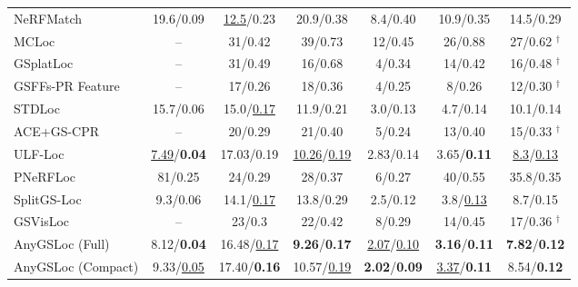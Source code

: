 \begin{table}[!t]
\begin{tabular}{@{}lcccccc@{}}
NeRFMatch~\cite{zhou2024nerfmatch} & 19.6/0.09 & \underline{12.5}/0.23 & 20.9/0.38 & 8.4/0.40 & 10.9/0.35 & 14.5/0.29 \\
MCLoc~\cite{reported260504730v1bibbib57} & -- & 31/0.42 & 39/0.73 & 12/0.45 & 26/0.88 & 27/0.62 $^\dagger$ \\
GSplatLoc~\cite{reported260504730v1bibbib47} & -- & 31/0.49 & 16/0.68 & 4/0.34 & 14/0.42 & 16/0.48 $^\dagger$ \\
GSFFs-PR Feature~\cite{reported260504730v1bibbib52} & -- & 17/0.26 & 18/0.36 & 4/0.25 & 8/0.26 & 12/0.30 $^\dagger$ \\
STDLoc~\cite{huang2025stdloc} & 15.7/0.06 & 15.0/\underline{0.17} & 11.9/0.21 & 3.0/0.13 & 4.7/0.14 & 10.1/0.14 \\
ACE+GS-CPR~\cite{reported260504730v1bibbib61} & -- & 20/0.29 & 21/0.40 & 5/0.24 & 13/0.40 & 15/0.33 $^\dagger$ \\
ULF-Loc~\cite{gu2026ulfloc} & \underline{7.49}/\textbf{0.04} & 17.03/0.19 & \underline{10.26}/\underline{0.19} & 2.83/0.14 & 3.65/\textbf{0.11} & \underline{8.3}/\underline{0.13} \\
PNeRFLoc~\cite{reported250319358v1bibbib68} & 81/0.25 & 24/0.29 & 28/0.37 & 6/0.27 & 40/0.55 & 35.8/0.35 \\
SplitGS-Loc~\cite{lee2026splitgsloc} & 9.3/0.06 & 14.1/\underline{0.17} & 13.8/0.29 & 2.5/0.12 & 3.8/\underline{0.13} & 8.7/0.15 \\
GSVisLoc~\cite{khatib2025gsvisloc} & -- & 23/0.3 & 22/0.42 & 8/0.29 & 14/0.45 & 17/0.36 $^\dagger$ \\
\midrule
AnyGSLoc (Full) & 8.12/\textbf{0.04} & 16.48/\underline{0.17} & \textbf{9.26}/\textbf{0.17} & \underline{2.07}/\underline{0.10} & \textbf{3.16}/\textbf{0.11} & \textbf{7.82}/\textbf{0.12} \\
AnyGSLoc (Compact) & 9.33/\underline{0.05} & 17.40/\textbf{0.16} & 10.57/\underline{0.19} & \textbf{2.02}/\textbf{0.09} & \underline{3.37}/\textbf{0.11} & 8.54/\textbf{0.12} \\
\bottomrule
\end{tabular}
\end{table}
